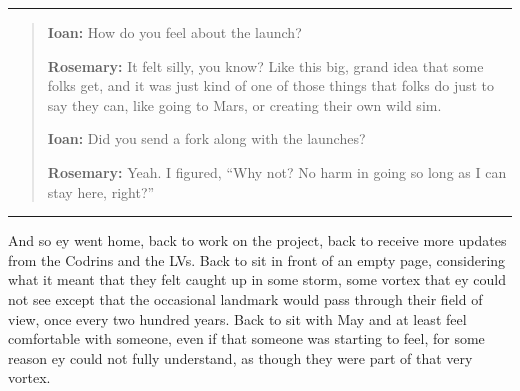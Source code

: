 \begin{center}\rule{0.5\linewidth}{0.5pt}\end{center}

\begin{quote}
\textbf{Ioan:} How do you feel about the launch?

\textbf{Rosemary:} It felt silly, you know? Like this big, grand idea that some folks get, and it was just kind of one of those things that folks do just to say they can, like going to Mars, or creating their own wild sim.

\textbf{Ioan:} Did you send a fork along with the launches?

\textbf{Rosemary:} Yeah. I figured, ``Why not? No harm in going so long as I can stay here, right?''
\end{quote}

\begin{center}\rule{0.5\linewidth}{0.5pt}\end{center}

\noindent And so ey went home, back to work on the project, back to receive more updates from the Codrins and the LVs. Back to sit in front of an empty page, considering what it meant that they felt caught up in some storm, some vortex that ey could not see except that the occasional landmark would pass through their field of view, once every two hundred years. Back to sit with May and at least feel comfortable with someone, even if that someone was starting to feel, for some reason ey could not fully understand, as though they were part of that very vortex.
